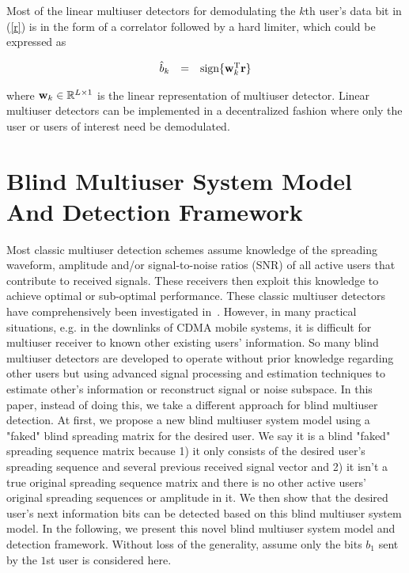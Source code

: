 \documentclass[a4paper,11pt,fleqn]{article}
\newcommand{\br}{{\mathbf r}}
\newcommand{\bw}{{\bf w}}
\begin{document}
Most of the linear multiuser detectors for demodulating the $k$th
user's data bit in (\ref{r}) is in the form of a correlator
followed by a hard limiter, which could be expressed as

\begin{equation}
\begin{array}{rcl}
\hat{b}_k &=& \mbox{sign}\{\bw_k^{\rm T}\br\}
\end{array} \label{linear}
\end{equation}

\noindent where $\bw_k \in \mathbb{R}^{L\times 1}$ is the linear
representation of multiuser detector. Linear multiuser detectors
can be implemented in a decentralized fashion where only the user
or users of interest need be demodulated.



\section{Blind Multiuser System Model And Detection Framework}

Most classic multiuser detection schemes assume knowledge of the
spreading waveform, amplitude and/or signal-to-noise ratios (SNR)
of all active users that contribute to received signals. These
receivers then exploit this knowledge to achieve optimal or
sub-optimal performance. These classic multiuser detectors have
comprehensively been investigated in~\cite{Verd98}. However, in
many practical situations, e.g. in the downlinks of CDMA mobile
systems, it is difficult for multiuser receiver to known other
existing users' information. So many blind multiuser detectors are
developed to operate without prior knowledge regarding other users
but using advanced signal processing and estimation techniques to
estimate other's information or reconstruct signal or noise
subspace. In this paper, instead of doing this, we take a
different approach for blind multiuser detection. At first, we
propose a new blind multiuser system model using a "faked" blind
spreading matrix for the desired user. We say it is a blind
"faked" spreading sequence matrix because 1) it only consists of
the desired user's spreading sequence and several previous
received signal vector and 2) it isn't a true original spreading
sequence matrix and there is no other active users' original
spreading sequences or amplitude in it. We then show that the
desired user's next information bits can be detected based on this
blind multiuser system model. In the following, we present this
novel blind multiuser system model and detection framework.
Without loss of the generality, assume only the bits $b_1$ sent by
the $1$st user is considered here.
\end{document}
